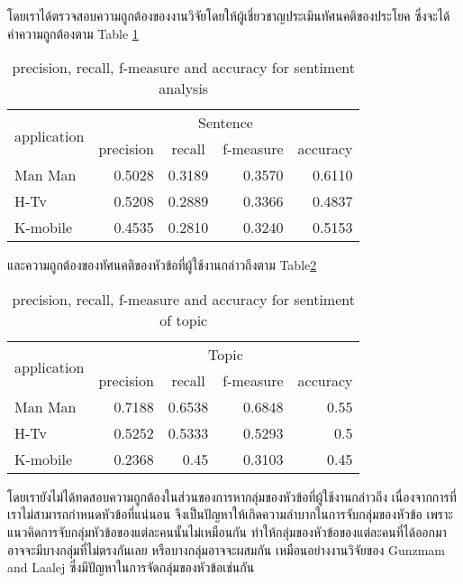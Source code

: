 โดยเราได้ตรวจสอบความถูกต้องของงานวิจัยโดยให้ผู้เชี่ยวชาญประเมินทัศนคติของประโยค ซึ่งจะได้ค่าความถูกต้องตาม Table \ref{table:f-measureSenti}
\begin{table}
	\caption{precision, recall, f-measure and accuracy for sentiment analysis}
	\label{table:f-measureSenti}
	\centering
	\begin{tabular}{|l|r|r|r|r|}
		\hline
		\multicolumn{1}{|c|}{\multirow{2}{*}{application}} &
		\multicolumn{4}{|c|}{Sentence}\\
		\cline{2-5}
		\multicolumn{1}{|c|}{}&
		\multicolumn{1}{|c|}{precision}&
		\multicolumn{1}{|c|}{recall}&
		\multicolumn{1}{|c|}{f-measure} &
		\multicolumn{1}{|c|}{accuracy} \\
		\hline
		Man Man & 0.5028 & 0.3189 & 0.3570 & 0.6110\\
		\hline
		H-Tv & 0.5208 & 0.2889 & 0.3366 & 0.4837 \\
		\hline
		K-mobile & 0.4535 & 0.2810 & 0.3240 & 0.5153 \\
		\hline
	\end{tabular}
\end{table}

และความถูกต้องของทัศนคติของหัวข้อที่ผู้ใช้งานกล่าวถึงตาม Table\ref{table:f-measureTopic}
\begin{table}
	\caption{precision, recall, f-measure and accuracy for sentiment of topic}
	\label{table:f-measureTopic}
	\centering
	\begin{tabular}{|l|r|r|r|r|}
		\hline
		\multicolumn{1}{|c|}{\multirow{2}{*}{application}} & 
		\multicolumn{4}{|c|}{Topic} \\
		\cline{2-5}
		\multicolumn{1}{|c|}{} &
		\multicolumn{1}{|c|}{precision}&
		\multicolumn{1}{|c|}{recall}&
		\multicolumn{1}{|c|}{f-measure} &
		\multicolumn{1}{|c|}{accuracy} \\
		\hline
		Man Man & 0.7188 & 0.6538 & 0.6848 & 0.55\\
		\hline
		H-Tv & 0.5252 & 0.5333 & 0.5293 & 0.5\\
		\hline
		K-mobile & 0.2368 & 0.45 & 0.3103 & 0.45\\
		\hline
	\end{tabular}
\end{table}

โดยเรายังไม่ได้ทดสอบความถูกต้องในส่วนของการหากลุ่มของหัวข้อที่ผู้ใช้งานกล่าวถึง เนื่องจากการที่เราไม่สามารถกำหนดหัวข้อที่แน่นอน จึงเป็นปัญหาให้เกิดความลำบากในการจับกลุ่มของหัวข้อ เพราะแนวคิดการจับกลุ่มหัวข้อของแต่ละคนนั้นไม่เหมือนกัน ทำให้กลุ่มของหัวข้อของแต่ละคนที่ได้ออกมาอาจจะมีบางกลุ่มที่ไม่ตรงกันเลย หรือบางกลุ่มอาจจะผสมกัน เหมือนอย่างงานวิจัยของ Gunzmam and Laalej \cite{userslikefeature} ซึ่งมีปัญหาในการจัดกลุ่มของหัวข้อเช่นกัน


